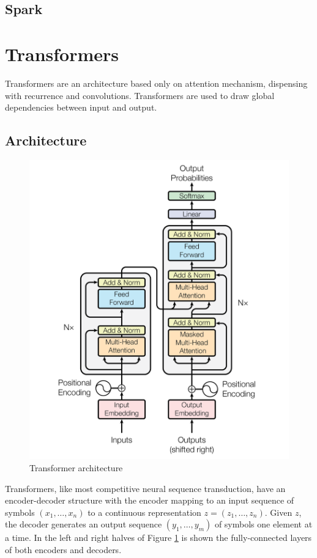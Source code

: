\documentclass[\main/main.tex]{subfiles}
\begin{document}
\subsection{Spark}

\section{Transformers}
Transformers \allowbreak\cite{vaswani2017attention} are an architecture based only on attention mechanism, dispensing with recurrence and convolutions. Transformers are used to draw global dependencies between input and output.
\subsection{Architecture}
\begin{figure}[h]
    \centering
    \includegraphics[scale=0.35]{images/transformer/transformer_model_architecture.png}
    \caption{Transformer architecture}
    \label{fig:transformer_architecture}
\end{figure}

Transformers, like most competitive neural sequence transduction, have an encoder-decoder structure with the encoder mapping to an input sequence of symbols $(x_1, \dots, x_n)$ to a continuous representation $z = (z_1, \dots, z_n)$. Given $z$, the decoder generates an output sequence $(y_1, \dots, y_m)$ of symbols one element at a time. In the left and right halves of Figure \ref{fig:transformer_architecture} is shown the fully-connected layers of both encoders and decoders.
\end{document}
